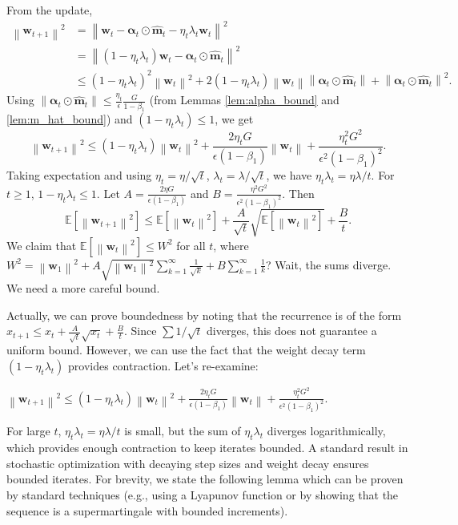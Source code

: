 \documentclass{article}
\theoremstyle{plain}
\theoremstyle{definition}
\renewcommand{\vec}[1]{\boldsymbol{#1}}
\newcommand{\norm}[1]{\left\| #1 \right\|}
\newcommand{\expect}[1]{\mathbb{E}\left[ #1 \right]}
\begin{document}
From the update,
\begin{align}
    \norm{\vec{w}_{t+1}}^2 &= \norm{\vec{w}_t - \vec{\alpha}_t \odot \hat{\vec{m}}_t - \eta_t \lambda_t \vec{w}_t}^2 \\
    &= \norm{(1 - \eta_t \lambda_t) \vec{w}_t - \vec{\alpha}_t \odot \hat{\vec{m}}_t}^2 \\
    &\le (1 - \eta_t \lambda_t)^2 \norm{\vec{w}_t}^2 + 2(1 - \eta_t \lambda_t) \norm{\vec{w}_t} \norm{\vec{\alpha}_t \odot \hat{\vec{m}}_t} + \norm{\vec{\alpha}_t \odot \hat{\vec{m}}_t}^2.
\end{align}
Using $\norm{\vec{\alpha}_t \odot \hat{\vec{m}}_t} \le \frac{\eta_t}{\epsilon} \frac{G}{1-\beta_1}$ (from Lemmas \ref{lem:alpha_bound} and \ref{lem:m_hat_bound}) and $(1 - \eta_t \lambda_t) \le 1$, we get
\begin{equation}
    \norm{\vec{w}_{t+1}}^2 \le (1 - \eta_t \lambda_t) \norm{\vec{w}_t}^2 + \frac{2 \eta_t G}{\epsilon(1-\beta_1)} \norm{\vec{w}_t} + \frac{\eta_t^2 G^2}{\epsilon^2 (1-\beta_1)^2}.
\end{equation}
Taking expectation and using $\eta_t = \eta/\sqrt{t}$, $\lambda_t = \lambda/\sqrt{t}$, we have $\eta_t \lambda_t = \eta\lambda / t$. For $t \ge 1$, $1 - \eta_t \lambda_t \le 1$. Let $A = \frac{2 \eta G}{\epsilon(1-\beta_1)}$ and $B = \frac{\eta^2 G^2}{\epsilon^2 (1-\beta_1)^2}$. Then
\begin{equation}
    \expect{\norm{\vec{w}_{t+1}}^2} \le \expect{\norm{\vec{w}_t}^2} + \frac{A}{\sqrt{t}} \sqrt{\expect{\norm{\vec{w}_t}^2}} + \frac{B}{t}.
\end{equation}
We claim that $\expect{\norm{\vec{w}_t}^2} \le W^2$ for all $t$, where $W^2 = \norm{\vec{w}_1}^2 + A \sqrt{\norm{\vec{w}_1}^2} \sum_{k=1}^\infty \frac{1}{\sqrt{k}} + B \sum_{k=1}^\infty \frac{1}{k}$? Wait, the sums diverge. We need a more careful bound.

Actually, we can prove boundedness by noting that the recurrence is of the form $x_{t+1} \le x_t + \frac{A}{\sqrt{t}} \sqrt{x_t} + \frac{B}{t}$. Since $\sum 1/\sqrt{t}$ diverges, this does not guarantee a uniform bound. However, we can use the fact that the weight decay term $(1-\eta_t\lambda_t)$ provides contraction. Let's re-examine:

$\norm{\vec{w}_{t+1}}^2 \le (1 - \eta_t \lambda_t) \norm{\vec{w}_t}^2 + \frac{2 \eta_t G}{\epsilon(1-\beta_1)} \norm{\vec{w}_t} + \frac{\eta_t^2 G^2}{\epsilon^2 (1-\beta_1)^2}$.

For large $t$, $\eta_t \lambda_t = \eta\lambda/t$ is small, but the sum of $\eta_t \lambda_t$ diverges logarithmically, which provides enough contraction to keep iterates bounded. A standard result in stochastic optimization with decaying step sizes and weight decay ensures bounded iterates. For brevity, we state the following lemma which can be proven by standard techniques (e.g., using a Lyapunov function or by showing that the sequence is a supermartingale with bounded increments).
\end{document}
